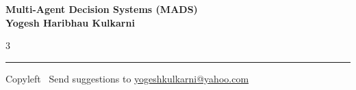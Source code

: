 \documentclass[8pt,landscape]{article}
\begin{document}
\footnotesize


\begin{center}
\Large{\textbf{Multi-Agent Decision Systems (MADS)\\ Yogesh Haribhau Kulkarni}}
\end{center}

\begin{multicols}{3}

\end{multicols}

\rule{\linewidth}{0.25pt}
\scriptsize
Copyleft \textcopyleft\  Send suggestions to
\href{http://www.yogeshkulkarni.com}{yogeshkulkarni@yahoo.com}
\end{document}
